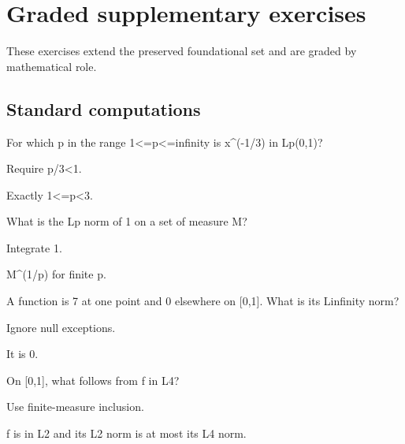 \section{Graded supplementary exercises}
These exercises extend the preserved foundational set and are graded by mathematical role.

\subsection*{Standard computations}

\begin{exercise}\label{exr:iii06-expand-01}
For which p in the range 1<=p<=infinity is x\textasciicircum{}(-1/3) in Lp(0,1)?
\end{exercise}
\begin{hint}
Require p/3<1.
\end{hint}
\begin{solution}
Exactly 1<=p<3.
\end{solution}

\begin{exercise}\label{exr:iii06-expand-02}
What is the Lp norm of 1 on a set of measure M?
\end{exercise}
\begin{hint}
Integrate 1.
\end{hint}
\begin{solution}
M\textasciicircum{}(1/p) for finite p.
\end{solution}

\begin{exercise}\label{exr:iii06-expand-03}
A function is 7 at one point and 0 elsewhere on [0,1]. What is its Linfinity norm?
\end{exercise}
\begin{hint}
Ignore null exceptions.
\end{hint}
\begin{solution}
It is 0.
\end{solution}

\begin{exercise}\label{exr:iii06-expand-04}
On [0,1], what follows from f in L4?
\end{exercise}
\begin{hint}
Use finite-measure inclusion.
\end{hint}
\begin{solution}
f is in L2 and its L2 norm is at most its L4 norm.
\end{solution}

